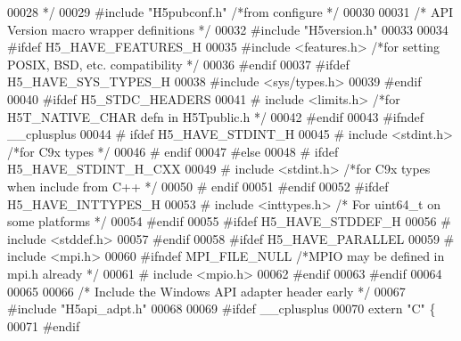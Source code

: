 \begin{DoxyCode}
00028 \textcolor{comment}{ */}
00029 \textcolor{preprocessor}{#include "H5pubconf.h"}      \textcolor{comment}{/*from configure                             */}
00030 
00031 \textcolor{comment}{/* API Version macro wrapper definitions */}
00032 \textcolor{preprocessor}{#include "H5version.h"}
00033 
00034 \textcolor{preprocessor}{#ifdef H5\_HAVE\_FEATURES\_H}
00035 \textcolor{preprocessor}{#include <features.h>}           \textcolor{comment}{/*for setting POSIX, BSD, etc. compatibility */}
00036 \textcolor{preprocessor}{#endif}
00037 \textcolor{preprocessor}{#ifdef H5\_HAVE\_SYS\_TYPES\_H}
00038 \textcolor{preprocessor}{#include <sys/types.h>}
00039 \textcolor{preprocessor}{#endif}
00040 \textcolor{preprocessor}{#ifdef H5\_STDC\_HEADERS}
00041 \textcolor{preprocessor}{#   include <limits.h>}      \textcolor{comment}{/*for H5T\_NATIVE\_CHAR defn in H5Tpublic.h    */}
00042 \textcolor{preprocessor}{#endif}
00043 \textcolor{preprocessor}{#ifndef \_\_cplusplus}
00044 \textcolor{preprocessor}{# ifdef H5\_HAVE\_STDINT\_H}
00045 \textcolor{preprocessor}{#   include <stdint.h>}      \textcolor{comment}{/*for C9x types                  */}
00046 \textcolor{preprocessor}{# endif}
00047 \textcolor{preprocessor}{#else}
00048 \textcolor{preprocessor}{# ifdef H5\_HAVE\_STDINT\_H\_CXX}
00049 \textcolor{preprocessor}{#   include <stdint.h>}      \textcolor{comment}{/*for C9x types when include from C++        */}
00050 \textcolor{preprocessor}{# endif}
00051 \textcolor{preprocessor}{#endif}
00052 \textcolor{preprocessor}{#ifdef H5\_HAVE\_INTTYPES\_H}
00053 \textcolor{preprocessor}{#   include <inttypes.h>}        \textcolor{comment}{/* For uint64\_t on some platforms            */}
00054 \textcolor{preprocessor}{#endif}
00055 \textcolor{preprocessor}{#ifdef H5\_HAVE\_STDDEF\_H}
00056 \textcolor{preprocessor}{#   include <stddef.h>}
00057 \textcolor{preprocessor}{#endif}
00058 \textcolor{preprocessor}{#ifdef H5\_HAVE\_PARALLEL}
00059 \textcolor{preprocessor}{#   include <mpi.h>}
00060 \textcolor{preprocessor}{#ifndef MPI\_FILE\_NULL       }\textcolor{comment}{/*MPIO may be defined in mpi.h already       */}\textcolor{preprocessor}{}
00061 \textcolor{preprocessor}{#   include <mpio.h>}
00062 \textcolor{preprocessor}{#endif}
00063 \textcolor{preprocessor}{#endif}
00064 
00065 
00066 \textcolor{comment}{/* Include the Windows API adapter header early */}
00067 \textcolor{preprocessor}{#include "H5api\_adpt.h"}
00068 
00069 \textcolor{preprocessor}{#ifdef \_\_cplusplus}
00070 \textcolor{keyword}{extern} \textcolor{stringliteral}{"C"} \{
00071 \textcolor{preprocessor}{#endif}

\end{DoxyCode}
